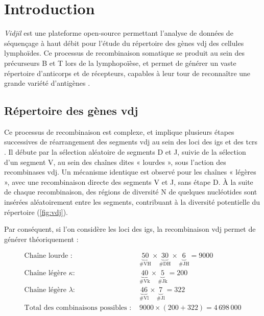 \chapter{Introduction}

\textit{Vidjil} est une plateforme open-source \cite{giraudFastMulticlonalClusterization2014}
permettant l'analyse de données de séquençage à haut débit pour l'étude du répertoire des gènes \gls{vdj} des 
cellules lymphoïdes. Ce processus de recombinaison somatique se produit au sein des précurseurs
B et T lors de la lymphopoïèse, et permet de générer un vaste répertoire d'anticorps et de récepteurs,
capables à leur tour de reconnaître une grande variété d'antigènes \cite{jonesTamingTransposonVDJ2004}.

\section{Répertoire des gènes \gls{vdj}}

Ce processus de recombinaison est complexe, et implique plusieurs étapes successives de réarrangement des segments
\gls{vdj} au sein des loci des \glspl{ig} et des \glspl{tcr} \cite{rothVDJRecombinationMechanism2014}.
Il débute par la sélection aléatoire de segments D et J, suivie de la sélection d'un segment V, au sein des chaînes
dites « lourdes », sous l'action des recombinases \gls{vdj}. Un mécanisme identique est observé pour les chaînes « légères »,
avec une recombinaison directe des segments V et J, sans étape D. À la suite de chaque recombinaison, des régions de diversité N 
de quelques nucléotides sont insérées aléatoirement entre les segments, contribuant à la diversité potentielle du répertoire 
(\autoref{fig:vdj}).



Par conséquent, si l'on considère les loci des \glspl{ig}, la recombinaison \gls{vdj} permet de générer théoriquement : 

\begin{equation}
    \label{eq:combinaisons}
    \begin{aligned}
    \text{Chaîne lourde : } & \underbrace{50}_{\text{\# VH}} \times \underbrace{30}_{\text{\# DH}} \times \underbrace{6}_{\text{\# JH}} = 9000 \\
    \text{Chaîne légère } \kappa : & \underbrace{40}_{\text{\# Vk}} \times \underbrace{5}_{\text{\# Jk}} = 200 \\
    \text{Chaîne légère } \lambda : & \underbrace{46}_{\text{\# Vl}} \times \underbrace{7}_{\text{\# Jl}} = 322 \\
    \text{Total des combinaisons possibles : } & 9000 \times (200 + 322) = 4\,698\,000
    \end{aligned}
\end{equation}

